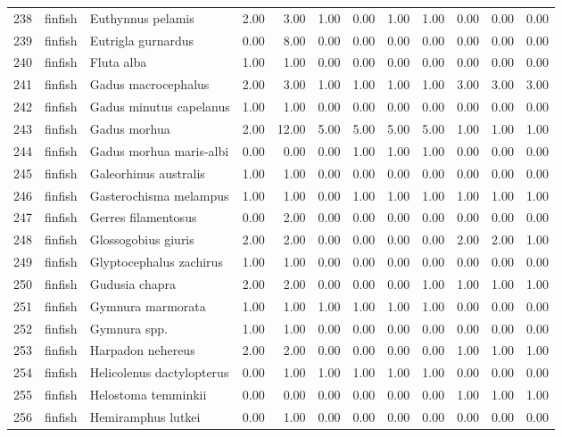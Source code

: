 \begin{table}[ht]
\begin{tabular}{rllrrrrrrrrr}
  238 & finfish & Euthynnus pelamis & 2.00 & 3.00 & 1.00 & 0.00 & 1.00 & 1.00 & 0.00 & 0.00 & 0.00 \\ 
  239 & finfish & Eutrigla gurnardus & 0.00 & 8.00 & 0.00 & 0.00 & 0.00 & 0.00 & 0.00 & 0.00 & 0.00 \\ 
  240 & finfish & Fluta alba & 1.00 & 1.00 & 0.00 & 0.00 & 0.00 & 0.00 & 0.00 & 0.00 & 0.00 \\ 
  241 & finfish & Gadus macrocephalus & 2.00 & 3.00 & 1.00 & 1.00 & 1.00 & 1.00 & 3.00 & 3.00 & 3.00 \\ 
  242 & finfish & Gadus minutus capelanus & 1.00 & 1.00 & 0.00 & 0.00 & 0.00 & 0.00 & 0.00 & 0.00 & 0.00 \\ 
  243 & finfish & Gadus morhua & 2.00 & 12.00 & 5.00 & 5.00 & 5.00 & 5.00 & 1.00 & 1.00 & 1.00 \\ 
  244 & finfish & Gadus morhua maris-albi & 0.00 & 0.00 & 0.00 & 1.00 & 1.00 & 1.00 & 0.00 & 0.00 & 0.00 \\ 
  245 & finfish & Galeorhinus australis & 1.00 & 1.00 & 0.00 & 0.00 & 0.00 & 0.00 & 0.00 & 0.00 & 0.00 \\ 
  246 & finfish & Gasterochisma melampus & 1.00 & 1.00 & 0.00 & 1.00 & 1.00 & 1.00 & 1.00 & 1.00 & 1.00 \\ 
  247 & finfish & Gerres filamentosus & 0.00 & 2.00 & 0.00 & 0.00 & 0.00 & 0.00 & 0.00 & 0.00 & 0.00 \\ 
  248 & finfish & Glossogobius giuris & 2.00 & 2.00 & 0.00 & 0.00 & 0.00 & 0.00 & 2.00 & 2.00 & 1.00 \\ 
  249 & finfish & Glyptocephalus zachirus & 1.00 & 1.00 & 0.00 & 0.00 & 0.00 & 0.00 & 0.00 & 0.00 & 0.00 \\ 
  250 & finfish & Gudusia chapra & 2.00 & 2.00 & 0.00 & 0.00 & 0.00 & 1.00 & 1.00 & 1.00 & 1.00 \\ 
  251 & finfish & Gymnura marmorata & 1.00 & 1.00 & 1.00 & 1.00 & 1.00 & 1.00 & 0.00 & 0.00 & 0.00 \\ 
  252 & finfish & Gymnura spp. & 1.00 & 1.00 & 0.00 & 0.00 & 0.00 & 0.00 & 0.00 & 0.00 & 0.00 \\ 
  253 & finfish & Harpadon nehereus & 2.00 & 2.00 & 0.00 & 0.00 & 0.00 & 0.00 & 1.00 & 1.00 & 1.00 \\ 
  254 & finfish & Helicolenus dactylopterus & 0.00 & 1.00 & 1.00 & 1.00 & 1.00 & 1.00 & 0.00 & 0.00 & 0.00 \\ 
  255 & finfish & Helostoma temminkii & 0.00 & 0.00 & 0.00 & 0.00 & 0.00 & 0.00 & 1.00 & 1.00 & 1.00 \\ 
  256 & finfish & Hemiramphus lutkei & 0.00 & 1.00 & 0.00 & 0.00 & 0.00 & 0.00 & 0.00 & 0.00 & 0.00 \\ 

\end{tabular}
\end{table}
